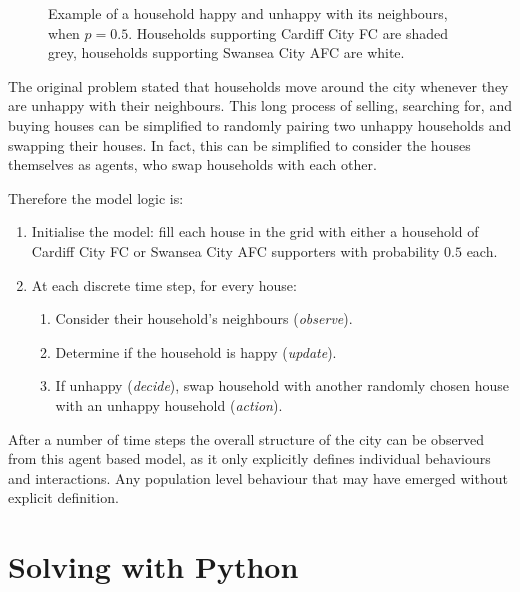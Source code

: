 \begin{figure}
    \begin{center}
        \subfigure[A happy household, with 6 similar neighbours (\(\frac{6}{8} > p = 0.5\))]{}
        \subfigure[An unhappy household, with 2 similar neighbours (\(\frac{2}{8} < p = 0.5\))]{}
    \end{center}
    \caption{Example of a household happy and unhappy with its neighbours, when
    \(p=0.5\). Households supporting Cardiff City FC are shaded grey, households
    supporting Swansea City AFC are white.}
    \label{fig:schelling_happyunhappy}
\end{figure}

The original problem stated that households move around the city
whenever they are unhappy with their neighbours.
This long process of selling, searching for, and buying houses can be simplified
to randomly pairing two unhappy households and swapping their houses.
In fact, this can be simplified to consider the houses themselves as agents,
who swap households with each other.

Therefore the model logic is:

\begin{enumerate}
  \item Initialise the model: fill each house in the grid with either a
  household of Cardiff City FC or Swansea City AFC supporters with
  probability \(0.5\) each.
  \item At each discrete time step, for every house:
  \begin{enumerate}
    \item Consider their household's neighbours (\textit{observe}).
    \item Determine if the household is happy (\textit{update}).
    \item If unhappy (\textit{decide}), swap household with another randomly
    chosen house with an unhappy household (\textit{action}).
  \end{enumerate}
\end{enumerate}

After a number of time steps the overall structure of the city can be observed
from this agent based model, as it only explicitly defines individual behaviours
and interactions.  Any population level behaviour that may have emerged without
explicit definition.

\section{Solving with Python}\label{sec:agent_based_simulation_solving-with-python}

